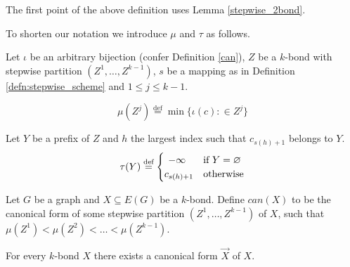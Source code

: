 \noindent
\begin{note}
The first point of the above definition uses Lemma \ref{stepwise_2bond}.
\end{note}

\clearpage %

\noindent
To shorten our notation we introduce $\mu$ and $\tau$ as follows.

\begin{defn}
	Let $\iota$ be an arbitrary bijection (confer Definition \ref{can}), $Z$ be a $k$-bond with stepwise partition $(Z^1,\ldots,Z^{k-1})$, $s$ be a mapping as in Definition \ref{defn:stepwise_scheme} and $1 \leq j \leq k - 1$.

\[
	\mu(Z^j) \stackrel{\text{def}}{=} \min\{ \iota(c) : \in Z^j \}
\]

\medskip

\noindent
Let $Y$ be a prefix of $Z$ and $h$ the largest index such that $c_{s(h)+1}$ belongs to $Y$.
	\[
		\tau(Y) \stackrel{\text{def}}{=}
		\begin{cases}
			\hfill -\infty    		 \hfill & \text{if $Y = \varnothing$} \\
			\hfill c_{s(h)+1} \hfill & \text{otherwise} \\
		\end{cases}
	\]
\end{defn}

\begin{defn}
	\label{defn:can_bond}

	Let $G$ be a graph and $X \subseteq E(G)$ be a $k$-bond. Define $can(X)$ to be the canonical form of some stepwise partition $(Z^1,\ldots,Z^{k-1})$ of $X$, such that $\mu(Z^1) < \mu(Z^2) < \ldots < \mu(Z^{k-1})$.
\end{defn}


\begin{lem}
	\label{lem:every_kbond_has_can}
	For every $k$-bond $X$ there exists a canonical form $\vec{X}$ of $X$.
\end{lem}

